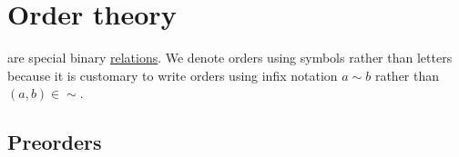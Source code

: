 \section{Order theory}\label{sec:order_theory}

\begin{remark}\label{rem:order_infix_notation}
   are special binary \hyperref[def:binary_relation]{relations}. We denote orders using symbols rather than letters because it is customary to write orders using infix notation \( a \sim b \) rather than \( (a, b) \in \sim \).
\end{remark}

\subsection{Preorders}\label{subsec:preorders}

